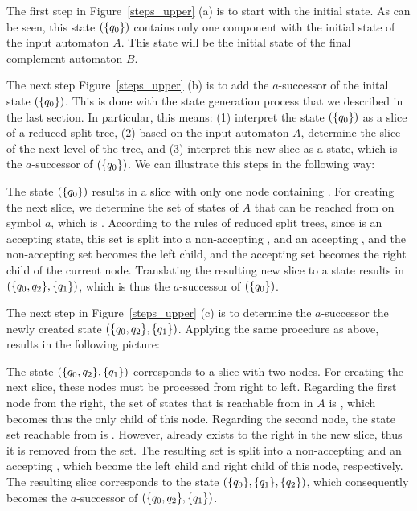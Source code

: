 The first step in Figure~\ref{steps_upper} (a) is to start with the initial state. As can be seen, this state $(\{q_{0}\})$ contains only one component with the initial state of the input automaton $A$. This state will be the initial state of the final complement automaton $B$.

The next step Figure~\ref{steps_upper} (b) is to add the $a$-successor of the inital state $(\{q_{0}\})$. This is done with the state generation process that we described in the last section. In particular, this means: (1) interpret the state $(\{q_{0}\})$ as a slice of a reduced split tree, (2) based on the input automaton $A$, determine the slice of the next level of the tree, and (3) interpret this new slice as a state, which is the $a$-successor of $(\{q_{0}\})$. We can illustrate this steps in the following way:

\begin{center}
\SlicesOne
\end{center}

The state $(\{q_{0}\})$ results in a slice with only one node containing . For creating the next slice, we determine the set of states of $A$ that can be reached from  on symbol $a$, which is . According to the rules of reduced split trees, since  is an accepting state, this set is split into a non-accepting , and an accepting , and the non-accepting set becomes the left child, and the accepting set becomes the right child of the current node. Translating the resulting new slice to a state results in $(\{q_{0},q_{2}\}, \{q_{1}\})$, which is thus the $a$-successor of $(\{q_{0}\})$.

The next step in Figure~\ref{steps_upper} (c) is to determine the $a$-successor the newly created state $(\{q_{0},q_{2}\}, \{q_{1}\})$. Applying the same procedure as above, results in the following picture:

\begin{center}
\SlicesTwo
\end{center}

The state $(\{q_{0},q_{2}\}, \{q_{1}\})$ corresponds to a slice with two nodes. For creating the next slice, these nodes must be processed from right to left. Regarding the first node from the right, the set of states that is reachable from  in $A$ is , which becomes thus the only child of this node. Regarding the second node, the state set reachable from  is . However,  already exists to the right in the new slice, thus it is removed from the set. The resulting set  is split into a non-accepting  and an accepting , which become the left child and right child of this node, respectively. The resulting slice corresponds to the state $(\{q_{0}\}, \{q_{1}\}, \{q_{2}\})$, which consequently becomes the $a$-successor of $(\{q_{0},q_{2}\}, \{q_{1}\})$.

